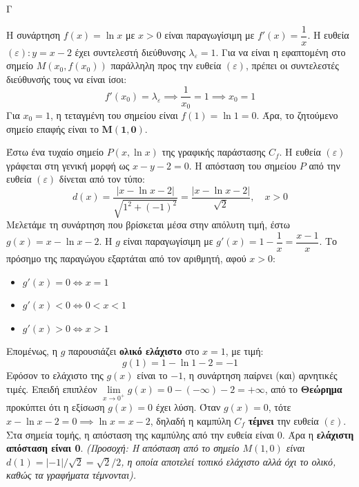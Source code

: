 
\begin{thema}{Γ}
\begin{erwthma}
\item Η συνάρτηση $f(x) = \ln x$ με $x > 0$ είναι παραγωγίσιμη με $f'(x) = \dfrac{1}{x}$.
Η ευθεία $(\varepsilon): y = x - 2$ έχει συντελεστή διεύθυνσης $\lambda_{\varepsilon} = 1$.
Για να είναι η εφαπτομένη στο σημείο $M(x_0, f(x_0))$ παράλληλη προς την ευθεία $(\varepsilon)$, πρέπει οι συντελεστές διεύθυνσής τους να είναι ίσοι:
\[ f'(x_0) = \lambda_{\varepsilon} \implies \frac{1}{x_0} = 1 \implies x_0 = 1 \]
Για $x_0 = 1$, η τεταγμένη του σημείου είναι $f(1) = \ln 1 = 0$.
Άρα, το ζητούμενο σημείο επαφής είναι το $\boldsymbol{M(1, 0)}$.

\item Έστω ένα τυχαίο σημείο $P(x, \ln x)$ της γραφικής παράστασης $C_f$.
Η ευθεία $(\varepsilon)$ γράφεται στη γενική μορφή ως $x - y - 2 = 0$.
Η απόσταση του σημείου $P$ από την ευθεία $(\varepsilon)$ δίνεται από τον τύπο:
\[ d(x) = \frac{|x - \ln x - 2|}{\sqrt{1^2 + (-1)^2}} = \frac{|x - \ln x - 2|}{\sqrt{2}}, \quad x > 0 \]
Μελετάμε τη συνάρτηση που βρίσκεται μέσα στην απόλυτη τιμή, έστω $g(x) = x - \ln x - 2$.
Η $g$ είναι παραγωγίσιμη με $g'(x) = 1 - \dfrac{1}{x} = \dfrac{x-1}{x}$.
Το πρόσημο της παραγώγου εξαρτάται από τον αριθμητή, αφού $x > 0$:
\begin{itemize}
    \item $g'(x) = 0 \Leftrightarrow x = 1$
    \item $g'(x) < 0 \Leftrightarrow 0 < x < 1$
    \item $g'(x) > 0 \Leftrightarrow x > 1$
\end{itemize}
Επομένως, η $g$ παρουσιάζει \textbf{ολικό ελάχιστο} στο $x = 1$, με τιμή:
\[ g(1) = 1 - \ln 1 - 2 = -1 \]
Εφόσον το ελάχιστο της $g(x)$ είναι το $-1$, η συνάρτηση παίρνει (και) αρνητικές τιμές.
Επειδή επιπλέον $\lim\limits_{x \to 0^+} g(x) = 0 - (-\infty) - 2 = +\infty$, από το \textbf{Θεώρημα } προκύπτει ότι η εξίσωση $g(x) = 0$ έχει λύση.
Όταν $g(x) = 0$, τότε $x - \ln x - 2 = 0 \implies \ln x = x - 2$, δηλαδή η καμπύλη $C_f$ \textbf{τέμνει} την ευθεία $(\varepsilon)$.
Στα σημεία τομής, η απόσταση της καμπύλης από την ευθεία είναι $0$. 
Άρα η \textbf{ελάχιστη απόσταση είναι 0}.
\textit{(Προσοχή: Η απόσταση από το σημείο $M(1,0)$ είναι $d(1) = |-1|/\sqrt{2} = \sqrt{2}/2$, η οποία αποτελεί τοπικό ελάχιστο αλλά όχι το ολικό, καθώς τα γραφήματα τέμνονται).}


\end{erwthma}
\end{thema}
